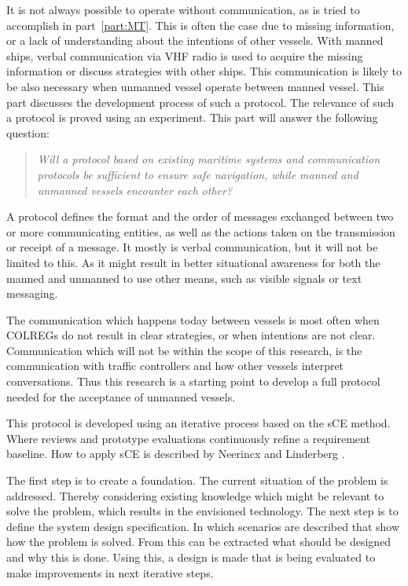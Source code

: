 
It is not always possible to operate without communication, as is tried to accomplish in part~\ref{part:MT}. This is often the case due to missing information, or a lack of understanding about the intentions of other vessels. With manned ships, verbal communication via \ac{VHF} radio is used to acquire the missing information or discuss strategies with other ships. This communication is likely to be also necessary when unmanned vessel operate between manned vessel. This part discusses the development process of such a protocol. The relevance of such a protocol is proved using an experiment. This part will answer the following question:

\begin{quotation}
	\emph{Will a protocol based on existing maritime systems and communication protocols be sufficient to ensure safe navigation, while manned and unmanned vessels encounter each other?}
\end{quotation}

A protocol defines the format and the order of messages exchanged between two or more communicating entities, as well as the actions taken on the transmission or receipt of a message. It mostly is verbal communication, but it will not be limited to this. As it might result in better situational awareness for both the manned and unmanned to use other means, such as visible signals or text messaging.

The communication which happens today between vessels is most often when \ac{COLREGs} do not result in clear strategies, or when intentions are not clear. Communication which will not be within the scope of this research, is the communication with traffic controllers and how other vessels interpret conversations.
Thus this research is a starting point to develop a full protocol needed for the acceptance of unmanned vessels.

This protocol is developed using an iterative process based on the \acf{sCE} method. Where reviews and prototype evaluations continuously refine a requirement baseline. How to apply \ac{sCE} is described by Neerincx and Linderberg \cite{Neerincx2012}.

The first step is to create a foundation. The current situation of the problem is addressed. Thereby considering existing knowledge which might be relevant to solve the problem, which results in the envisioned technology. The next step is to define the system design specification. In which scenarios are described that show how the problem is solved. From this can be extracted what should be designed and why this is done. Using this, a design is made that is being evaluated to make improvements in next iterative steps.